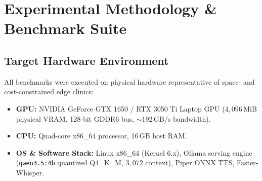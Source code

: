 \documentclass[10pt,journal,compsoc]{IEEEtran}
\begin{document}
\section{Experimental Methodology \& Benchmark Suite}
\label{sec:methodology}

\subsection{Target Hardware Environment}
All benchmarks were executed on physical hardware representative of space- and cost-constrained edge clinics:
\begin{itemize}
    \item \textbf{GPU:} NVIDIA GeForce GTX 1650 / RTX 3050 Ti Laptop GPU ($4{,}096$\,MiB physical VRAM, 128-bit GDDR6 bus, $\sim 192$\,GB/s bandwidth).
    \item \textbf{CPU:} Quad-core x86\_64 processor, 16\,GB host RAM.
    \item \textbf{OS \& Software Stack:} Linux x86\_64 (Kernel 6.x), Ollama serving engine (\texttt{qwen3.5:4b} quantized Q4\_K\_M, $3{,}072$ context), Piper ONNX TTS, Faster-Whisper.
\end{itemize}
\end{document}
